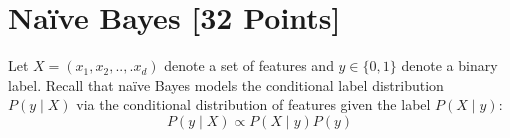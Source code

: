 \section{Na\"{i}ve  Bayes [32 Points]}


Let $X=(x_1,x_2,..,.x_d)$ denote a set of features and $y\in \{0, 1\}$ denote a binary label. Recall that na\"{i}ve Bayes models the conditional label distribution $P(y \mid X)$ via the conditional distribution of features given the label $P(X \mid y)$:
\begin{equation}\label{eqn:pxy}
P(y \mid X) \propto P(X \mid y)P(y) \nonumber
\end{equation}

